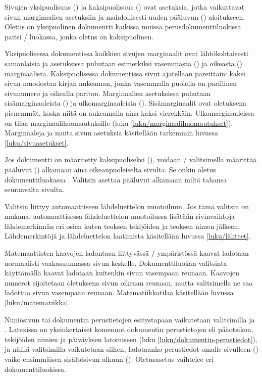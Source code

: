 Sivujen yksipuolisuus () ja kaksipuolisuus
() ovat asetuksia, jotka vaikuttavat sivun marginaalien
asetuksiin ja mahdollisesti uuden pääluvun ()
aloitukseen. Oletus on yksipuolinen dokumentti kaikissa muissa
perusdokumenttiluokissa paitsi \-/ luokassa, jonka oletus
on kaksipuolinen.

Yksipuolisessa dokumentissa kaikkien sivujen marginaalit ovat
lähtökohtaisesti samanlaisia ja asetuksissa puhutaan esimerkiksi
vasemmasta () ja oikeasta ()
marginaalista. Kaksipuolisessa dokumentissa sivut ajatellaan pareittain:
kaksi sivua muodostaa kirjan aukeaman, jonka vasemmalla puolella on
parillinen sivunumero ja oikealla pariton. Marginaalien asetuksissa
puhutaan sisämarginaaleista () ja ulkomarginaaleista
(). Sisämarginaalit ovat oletuksena pienemmät, koska
niitä on aukeamalla aina kaksi vierekkäin. Ulkomarginaaleissa on tilaa
marginaalihuomautuksille (luku \ref{luku/marginaalihuomautukset}).
Marginaaleja ja muita sivun asetuksia käsitellään tarkemmin luvussa
\ref{luku/sivuasetukset}.

Jos dokumentti on määritetty kaksipuoliseksi (), voidaan
\-/ valitsimella määrittää pääluvut
() alkamaan aina oikeanpuoleiselta sivulta. Se onkin
oletus dokumenttiluokassa . Valitsin 
asettaa pääluvut alkamaan miltä tahansa seuraavalta sivulta.

Valitsin  liittyy automaattiseen lähdeluettelon
muotoiluun. Jos tämä valitsin on mukana, automaattisessa lähdeluettelon
muotoilussa lisätään rivinvaihtoja lähdemerkinnän eri osien kuten
teoksen tekijöiden ja teoksen nimen jälkeen. Lähdemerkintöjä ja
lähdeluettelon laatimista käsitellään luvussa \ref{luku/lähteet}.

Matemaattisten kaavojen ladontaan liittyvässä \-/
ympäristössä kaavat ladotaan normaalisti vaakasuunnassa sivun keskelle.
Dokumenttiluokan valitsinta  käyttämällä kaavat ladotaan
kuitenkin sivun vasempaan reunaan. Kaavojen numerot sijoitetaan
oletuksena sivun oikeaan reunaan, mutta valitsimella  ne
saa ladottua sivun vasempaan reunaan. Matematiikkatilaa käsitellään
luvussa \ref{luku/matematiikka}.

Nimiösivun tai dokumentin perustietojen esitystapaan vaikutetaan
valitsimilla  ja . Latexissa
on yksinkertaiset komennot dokumentin perustietojen eli pääotsikon,
tekijöiden nimien ja päiväyksen latomiseen (luku
\ref{luku/dokumentin-perustiedot}), ja näillä valitsimilla vaikutetaan
siihen, ladotaanko perustiedot omalle sivulleen ()
vaiko ensimmäisen sisältösivun alkuun ().
Oletus\-asetus vaihtelee eri dokumenttiluokissa.


